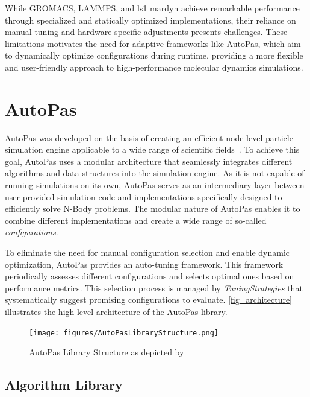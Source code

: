 \documentclass[conference]{IEEEtran}
\begin{document}
\vspace{0.2cm}

While GROMACS, LAMMPS, and ls1 mardyn achieve remarkable performance through specialized and statically optimized implementations, their reliance on manual tuning and hardware-specific adjustments presents challenges. These limitations motivates the need for adaptive frameworks like AutoPas, which aim to dynamically optimize configurations during runtime, providing a more flexible and user-friendly approach to high-performance molecular dynamics simulations.

\section{AutoPas}

AutoPas was developed on the basis of creating an efficient node-level particle simulation engine applicable to a wide range of scientific fields~\cite{Tchipev2020}. To achieve this goal, AutoPas uses a modular architecture that seamlessly integrates different algorithms and data structures into the simulation engine. As it is not capable of running simulations on its own, AutoPas serves as an intermediary layer between user-provided simulation code and implementations specifically designed to efficiently solve N-Body problems. The modular nature of AutoPas enables it to combine different implementations and create a wide range of so-called \textit{configurations}.

To eliminate the need for manual configuration selection and enable dynamic optimization, AutoPas provides an auto-tuning framework. This framework periodically assesses different configurations and selects optimal ones based on performance metrics. This selection process is managed by \textit{TuningStrategies} that systematically suggest promising configurations to evaluate. \autoref{fig_architecture} illustrates the high-level architecture of the AutoPas library.

\begin{figure}[H]
    \centering
    \texttt{[image: figures/AutoPasLibraryStructure.png]}
    \caption{AutoPas Library Structure as depicted by~\cite{Newcome2023Poster}}
    \label{fig_architecture}
\end{figure}

\subsection{Algorithm Library}
\end{document}

